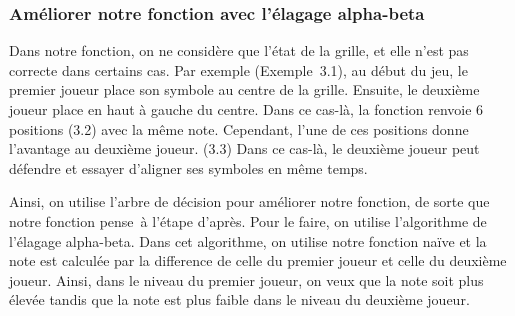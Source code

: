 \documentclass[12pt, a4paper]{article}
\begin{document}
\subsubsection{Améliorer notre fonction avec l'élagage alpha-beta}
Dans notre fonction, on ne considère que l'état de la grille, et elle n'est pas correcte dans certains cas. Par exemple \mbox{(Exemple 3.1)}, au début du jeu, le premier joueur place son symbole au centre de la grille. Ensuite, le deuxième joueur place en haut à gauche du centre. Dans ce cas-là, la fonction renvoie 6 positions (3.2) avec la même note. Cependant, l'une de ces positions donne l'avantage au deuxième joueur. (3.3) Dans ce cas-là, le deuxième joueur peut défendre et essayer d'aligner ses symboles en même temps. 
\begin{center}
    \cleargoban
    \cleargoban
    \cleargoban
\end{center}
Ainsi, on utilise l'arbre de décision pour améliorer notre fonction, de sorte que notre fonction \og pense\fg \ à l'étape d'après. Pour le faire, on utilise l'algorithme de l'élagage alpha-beta. Dans cet algorithme, on utilise notre fonction naïve et la note est calculée par la difference de celle du premier joueur et celle du deuxième joueur. Ainsi, dans le niveau du premier joueur, on veux que la note soit plus élevée tandis que la note est plus faible dans le niveau du deuxième joueur.
\end{document}
